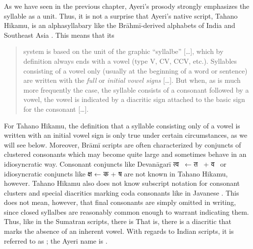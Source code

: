 As we have seen in the previous chapter, Ayeri's prosody strongly emphasizes 
the syllable as a unit. Thus, it is not a surprise that Ayeri's native script,
Tahano Hikamu, is an alphasyllabary like the Brāhmī-derived alphabets of India 
and Southeast Asia \parencites{salomon1996}{court1996}. 
This means that its 

\blockcquote[376]{salomon1996}{system is based on the unit of the graphic 
\enquote{syllalbe} […], which by definition always ends with a vowel (type V, 
CV, CCV, etc.). Syllables consisting of a vowel only (usually at the beginning 
of a word or sentence) are written with the \emph{full} or \emph{initial vowel 
signs} […]. But when, as is much more frequently the case, the syllable 
consists of a consonant followed by a vowel, the vowel is indicated by a 
diacritic sign attached to the basic sign for the consonant […].}

For Tahano Hikamu, the definition that a syllable consisting only of a vowel is 
written with an initial vowel sign is only true under certain circumstances, as 
we will see below. Moreover, Brāmī scripts are often characterized by 
conjuncts of clustered consonants which may become quite large and sometimes 
behave in an idiosyncratic way. Consonant conjuncts like Devanāgarī {\FS 
त्व}~ ← {\FS त}~ + {\FS व}~ or idiosyncratic 
conjuncts like {\FS क्ष}  ← {\FS क}  + {\FS ष}  are 
not known in Tahano Hikamu, however. Tahano Hikamu also does not know subscript 
notation for consonant clusters and special diacritics marking coda consonants 
like in Javanese \citep[478--479]{kuipersmcdermott1996}. This does not mean, 
however, that final consonants are simply omitted in writing, since closed 
syllalbes are reasonably common enough to warrant indicating them. Thus, like in 
the Sumatran scripts, there is  That is, there is a diacritic that 
marks the absence of an inherent vowel. With regards to Indian scripts, 
it is referred to as ; the Ayeri name is 
.

